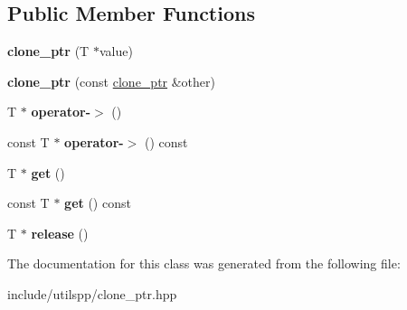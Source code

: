 \subsection*{Public Member Functions}
\begin{DoxyCompactItemize}
\item 
\hypertarget{classutilspp_1_1clone__ptr_adb07a3d88bef21f8c446a15180037cff}{{\bfseries clone\-\_\-ptr} (T $\ast$value)}\label{classutilspp_1_1clone__ptr_adb07a3d88bef21f8c446a15180037cff}

\item 
\hypertarget{classutilspp_1_1clone__ptr_a67f01cdd8cd0bd0b215ba1c56d59b4c5}{{\bfseries clone\-\_\-ptr} (const \hyperlink{classutilspp_1_1clone__ptr}{clone\-\_\-ptr} \&other)}\label{classutilspp_1_1clone__ptr_a67f01cdd8cd0bd0b215ba1c56d59b4c5}

\item 
\hypertarget{classutilspp_1_1clone__ptr_a076ae7fd6fbea7f96c840e0f82919f05}{T $\ast$ {\bfseries operator-\/$>$} ()}\label{classutilspp_1_1clone__ptr_a076ae7fd6fbea7f96c840e0f82919f05}

\item 
\hypertarget{classutilspp_1_1clone__ptr_a68cc19aecaed2963ae4a0208ab31f19b}{const T $\ast$ {\bfseries operator-\/$>$} () const }\label{classutilspp_1_1clone__ptr_a68cc19aecaed2963ae4a0208ab31f19b}

\item 
\hypertarget{classutilspp_1_1clone__ptr_a90a155df754cd98da6b24a2e9c3946ec}{T $\ast$ {\bfseries get} ()}\label{classutilspp_1_1clone__ptr_a90a155df754cd98da6b24a2e9c3946ec}

\item 
\hypertarget{classutilspp_1_1clone__ptr_ad55d16d5ada4a014219c0141210d1dc4}{const T $\ast$ {\bfseries get} () const }\label{classutilspp_1_1clone__ptr_ad55d16d5ada4a014219c0141210d1dc4}

\item 
\hypertarget{classutilspp_1_1clone__ptr_ad1e37406c84cbcb27267f0d170b1958f}{T $\ast$ {\bfseries release} ()}\label{classutilspp_1_1clone__ptr_ad1e37406c84cbcb27267f0d170b1958f}

\end{DoxyCompactItemize}


The documentation for this class was generated from the following file\-:\begin{DoxyCompactItemize}
\item 
include/utilspp/clone\-\_\-ptr.\-hpp\end{DoxyCompactItemize}
